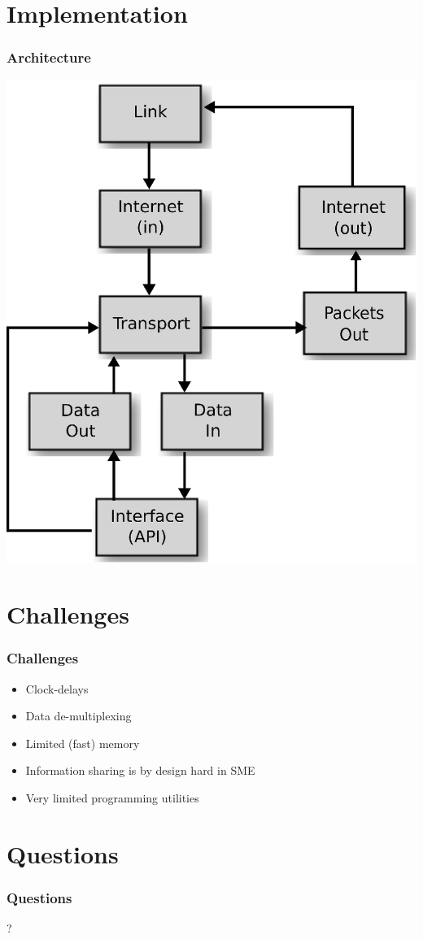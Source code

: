 \documentclass{beamer}
\begin{document}
\section{Implementation}
\begin{frame}
  \frametitle{Architecture}
  \begin{center}
    \includegraphics[scale=0.5]{graph}
  \end{center}
  

\end{frame}

\section{Challenges}
\begin{frame}
  \frametitle{Challenges}

\begin{itemize}
  \item Clock-delays
  \item Data de-multiplexing 
  \item Limited (fast) memory
  \item Information sharing is by design hard in SME
  \item Very limited programming utilities
\end{itemize}

\end{frame}

\section{Questions}
\begin{frame}
  \frametitle{Questions}
  \begin{center}
    ?
  \end{center}
\end{frame}
\end{document}
